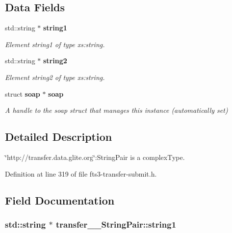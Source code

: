 \subsection*{Data Fields}
\begin{DoxyCompactItemize}
\item 
std::string $\ast$ {\bf string1}
\begin{DoxyCompactList}\small\item\em Element string1 of type xs:string. \item\end{DoxyCompactList}\item 
std::string $\ast$ {\bf string2}
\begin{DoxyCompactList}\small\item\em Element string2 of type xs:string. \item\end{DoxyCompactList}\item 
struct {\bf soap} $\ast$ {\bf soap}\label{classtransfer____StringPair_a476511de19ad330c660dd803c0da2025}

\begin{DoxyCompactList}\small\item\em A handle to the soap struct that manages this instance (automatically set) \item\end{DoxyCompactList}\end{DoxyCompactItemize}


\subsection{Detailed Description}
\char`\"{}http://transfer.data.glite.org\char`\"{}:StringPair is a complexType. 

Definition at line 319 of file fts3-\/transfer-\/submit.h.



\subsection{Field Documentation}
\subsubsection[{string1}]{\setlength{\rightskip}{0pt plus 5cm}std::string $\ast$ {\bf transfer\_\-\_\-StringPair::string1}}\label{classtransfer____StringPair_a007d23397bea7f93904fb80e81ab50a5}


